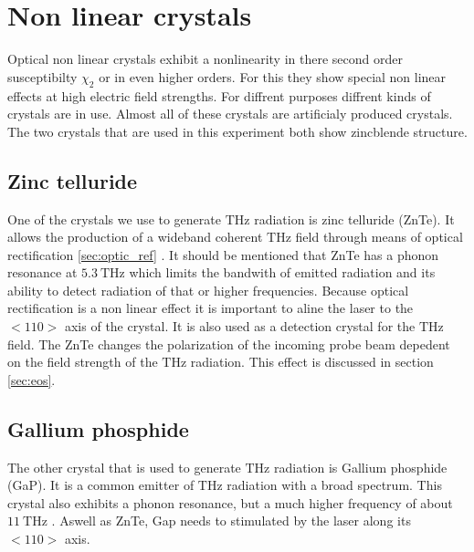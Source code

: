 \FloatBarrier
\section{Non linear crystals}
Optical non linear crystals exhibit a nonlinearity in there second order susceptibilty $\chi_2$ or in even higher orders.
For this they show special non linear effects at high electric field strengths.
For diffrent purposes diffrent kinds of crystals are in use.
Almost all of these crystals are artificialy produced crystals.
The two crystals that are used in this experiment both show zincblende structure.


\subsection{Zinc telluride}
One of the crystals we use to generate $\si{\tera\hertz}$ radiation is zinc telluride (ZnTe). 
It allows the production of a wideband coherent $\si{\tera\hertz}$ field through means of optical rectification \ref{sec:optic_ref} \cite{ZnTe_Nahata_Weling_1996}.
It should be mentioned that ZnTe has a phonon resonance at $\SI{5.3}{\tera\hertz}$ \cite{phonon_modes} which limits the bandwith of emitted radiation and its ability to detect radiation of that or higher frequencies.
Because optical rectification is a non linear effect it is important to aline the laser to the $<110>$ axis of the crystal.
It is also used as a detection crystal for the $\si{\tera\hertz}$ field.
The ZnTe changes the polarization of the incoming probe beam depedent on the field strength of the $\si{\tera\hertz}$ radiation.
This effect is discussed in section \ref{sec:eos}.

\subsection{Gallium phosphide}
The other crystal that is used to generate $\si{\tera\hertz}$ radiation is Gallium phosphide (GaP).
It is a common emitter of $\si{\tera\hertz}$ radiation with a broad spectrum.
This crystal also exhibits a phonon resonance, but a much higher frequency of about $\SI{11}{\tera\hertz}$ \cite[60]{wiki_book}.
Aswell as ZnTe, Gap needs to stimulated by the laser along its $<110>$ axis.
